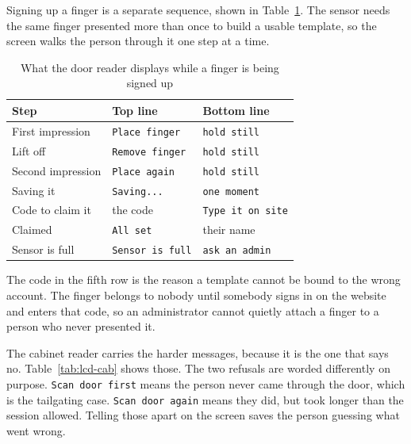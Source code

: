Signing up a finger is a separate sequence, shown in
Table~\ref{tab:lcd-enroll}. The sensor needs the same finger presented more than
once to build a usable template, so the screen walks the person through it one
step at a time.

\begin{table}[H]
\centering
\caption{What the door reader displays while a finger is being signed up}
\label{tab:lcd-enroll}
\linespread{1}\selectfont
\begin{tabular}{@{}p{40mm}p{34mm}p{34mm}@{}}
\toprule
Step & Top line & Bottom line \\
\midrule
First impression  & \texttt{Place finger}   & \texttt{hold still} \\
Lift off          & \texttt{Remove finger}  & \texttt{hold still} \\
Second impression & \texttt{Place again}    & \texttt{hold still} \\
Saving it         & \texttt{Saving...}      & \texttt{one moment} \\
Code to claim it  & the code                & \texttt{Type it on site} \\
Claimed           & \texttt{All set}        & their name \\
Sensor is full    & \texttt{Sensor is full} & \texttt{ask an admin} \\
\bottomrule
\end{tabular}
\end{table}

The code in the fifth row is the reason a template cannot be bound to the wrong
account. The finger belongs to nobody until somebody signs in on the website and
enters that code, so an administrator cannot quietly attach a finger to a person
who never presented it.

The cabinet reader carries the harder messages, because it is the one that says
no. Table~\ref{tab:lcd-cab} shows those. The two refusals are worded
differently on purpose. \texttt{Scan door first} means the person never came
through the door, which is the tailgating case. \texttt{Scan door again} means
they did, but took longer than the session allowed. Telling those apart on the
screen saves the person guessing what went wrong.

